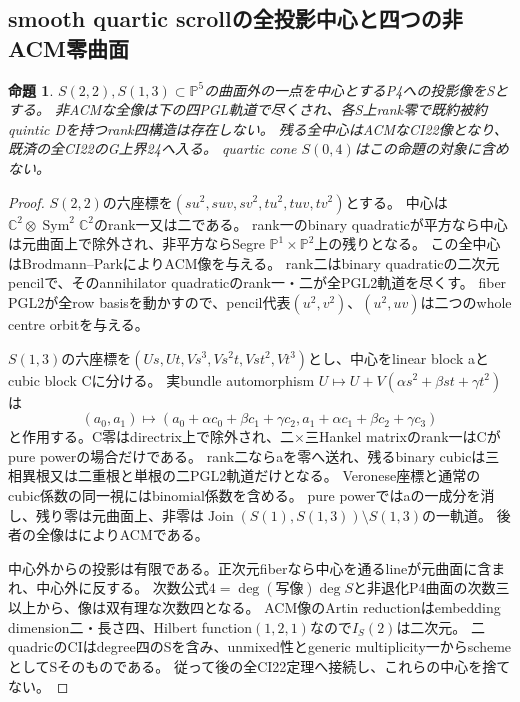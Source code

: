 \documentclass[a4paper,11pt]{ltjsarticle}
\newtheorem{proposition}{命題}[section]
\theoremstyle{definition}
\begin{document}
\subsection{smooth quartic scrollの全投影中心と四つの非ACM零曲面}
\begin{proposition}\label{prop:projected-quartic-scroll-zero}
$S(2,2),S(1,3)\subset\mathbb P^5$の曲面外の一点を中心とするP4への投影像をSとする。
非ACMな全像は下の四PGL軌道で尽くされ、各S上rank零で既約被約quintic Dを持つrank四構造は存在しない。
残る全中心はACMなCI22像となり、既済の全CI22のG上界24へ入る。
quartic cone $S(0,4)$はこの命題の対象に含めない。
\end{proposition}
\begin{proof}
$S(2,2)$の六座標を$(su^2,suv,sv^2,tu^2,tuv,tv^2)$とする。
中心は$\mathbb C^2\otimes\operatorname{Sym}^2\mathbb C^2$のrank一又は二である。
rank一のbinary quadraticが平方なら中心は元曲面上で除外され、非平方ならSegre $\mathbb P^1\times\mathbb P^2$上の残りとなる。
この全中心はBrodmann--Park\cite[Theorem 6.2(b)(iii), p.17]{brodmannpark}によりACM像を与える。
rank二はbinary quadraticの二次元pencilで、そのannihilator quadraticのrank一・二が全PGL2軌道を尽くす。
fiber PGL2が全row basisを動かすので、pencil代表$(u^2,v^2)$、$(u^2,uv)$は二つのwhole centre orbitを与える。

$S(1,3)$の六座標を$(Us,Ut,Vs^3,Vs^2t,Vst^2,Vt^3)$とし、中心をlinear block aとcubic block Cに分ける。
実bundle automorphism $U\mapsto U+V(\alpha s^2+\beta st+\gamma t^2)$は
\[
 (a_0,a_1)\longmapsto
 (a_0+\alpha c_0+\beta c_1+\gamma c_2,
  a_1+\alpha c_1+\beta c_2+\gamma c_3)
\]
と作用する。C零はdirectrix上で除外され、二×三Hankel matrixのrank一はCがpure powerの場合だけである。
rank二ならaを零へ送れ、残るbinary cubicは三相異根又は二重根と単根の二PGL2軌道だけとなる。
Veronese座標と通常のcubic係数の同一視にはbinomial係数を含める。
pure powerではaの一成分を消し、残り零は元曲面上、非零は$\operatorname{Join}(S(1),S(1,3))\setminus S(1,3)$の一軌道。
後者の全像は\cite[Theorem 6.2(b)(ii), Remark 6.4(v)]{brodmannpark}によりACMである。

中心外からの投影は有限である。正次元fiberなら中心を通るlineが元曲面に含まれ、中心外に反する。
次数公式$4=\deg(\text{写像})\deg S$と非退化P4曲面の次数三以上から、像は双有理な次数四となる。
ACM像のArtin reductionはembedding dimension二・長さ四、Hilbert function$(1,2,1)$なので$I_S(2)$は二次元。
二quadricのCIはdegree四のSを含み、unmixed性とgeneric multiplicity一からschemeとしてSそのものである。
従って後の全CI22定理へ接続し、これらの中心を捨てない。


\end{proof}
\end{document}
